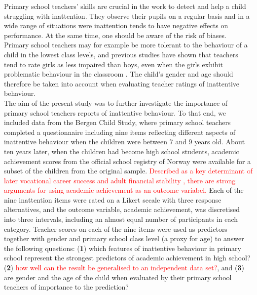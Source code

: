 \documentclass[10pt,letterpaper]{article}
\begin{document}
Primary school teachers' skills are crucial in the work to detect and help a child struggling with inattention. They observe their pupils on a regular basis and in a wide range of situations were inattention tends to have negative effects on performance. At the same time, one should be aware of the risk of biases. Primary school teachers may for example be more tolerant to the behaviour of a child in the lowest class levels, and previous studies have shown that teachers tend to rate girls as less impaired than boys, even when the girls exhibit problematic behaviour in the classroom \cite{Becker2013, Bussing2003c, Ohan2009}. The child's gender and age should therefore be taken into account when evaluating teacher ratings of inattentive behaviour. \\

The aim of the present study was to further investigate the importance of primary school teachers reports of inattentive behaviour. To that end, we included data from the Bergen Child Study, where primary school teachers completed a questionnaire including nine items reflecting different aspects of inattentive behaviour when the children were between 7 and 9 years old. About ten years later, when the children had become high school students, academic achievement scores from the official school registry of Norway were available for a subset of the children from the original sample. \textcolor{red}{Described as a key determinant of later vocational career success and adult
financial stability \cite{Fried2016}, there are strong arguments for using academic achievement as an outcome variabel.} Each of the nine inattention items were rated on a Likert secale with three response alternatives, and the outcome variable, academic achievement, was discretised into three intervals, including an almost equal number of participants in each category.  Teacher scores on each of the nine items were used as predictors together with gender and primary school class level (a proxy for age) to answer the following questions: ({\bf1}) which features of inattentive behaviour in primary school represent the strongest predictors of academic achievement in high school? ({\bf 2}) \textcolor{red}{how well can the result be generalised to an independent data set?}, and ({\bf3}) are gender and the age of the child when evaluated by their primary school teachers of importance to the prediction?  \\ 
\end{document}
